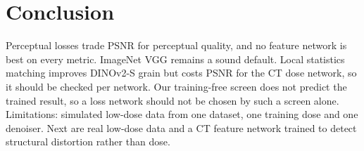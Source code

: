 \section{Conclusion}
\label{sec:conclusion}

Perceptual losses trade PSNR for perceptual quality, and no feature network is best on every metric. ImageNet VGG
remains a sound default. Local statistics matching improves DINOv2-S grain but costs PSNR for the CT dose network, so
it should be checked per network. Our training-free screen does not predict the trained result, so a loss network
should not be chosen by such a screen alone. Limitations: simulated low-dose data from one dataset, one training dose
and one denoiser. Next are real low-dose data and a CT feature network trained to detect structural distortion rather
than dose.
